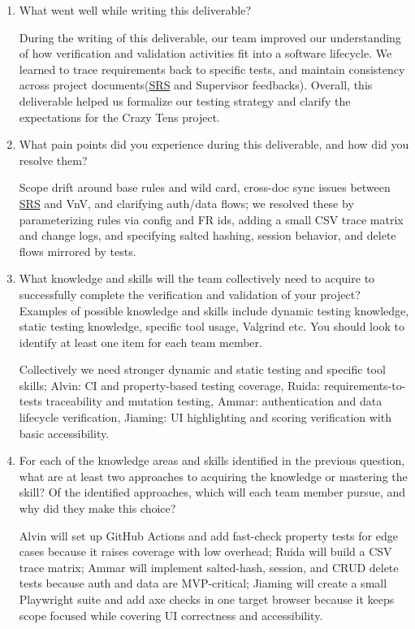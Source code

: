 \documentclass[12pt, titlepage]{article}
\begin{document}


\begin{enumerate}
  \item What went well while writing this deliverable? 

During the writing of this deliverable, our team improved our understanding of how verification and validation activities fit into a software lifecycle.  We learned to trace requirements back to specific tests, and maintain consistency across project documents(\href{../SRS/SRS.pdf}{SRS} and Supervisor feedbacks). Overall, this deliverable helped us formalize our testing strategy and clarify the expectations for the Crazy Tens project.
  \item What pain points did you experience during this deliverable, and how
    did you resolve them?


Scope drift around base rules and wild card, cross-doc sync issues between \href{../SRS/SRS.pdf}{SRS} and VnV, and clarifying auth/data flows; we resolved these by parameterizing rules via config and FR ids, adding a small CSV trace matrix and change logs, and specifying salted hashing, session behavior, and delete flows mirrored by tests.
  \item What knowledge and skills will the team collectively need to acquire to
  successfully complete the verification and validation of your project?
  Examples of possible knowledge and skills include dynamic testing knowledge,
  static testing knowledge, specific tool usage, Valgrind etc.  You should look to
  identify at least one item for each team member.

Collectively we need stronger dynamic and static testing and specific tool skills; Alvin: CI and property-based testing coverage, Ruida: requirements-to-tests traceability and mutation testing, Ammar: authentication and data lifecycle verification, Jiaming: UI highlighting and scoring verification with basic accessibility.
  \item For each of the knowledge areas and skills identified in the previous
  question, what are at least two approaches to acquiring the knowledge or
  mastering the skill?  Of the identified approaches, which will each team
  member pursue, and why did they make this choice?

Alvin will set up GitHub Actions and add fast-check property tests for edge cases because it raises coverage with low overhead; Ruida will build a CSV trace matrix; Ammar will implement salted-hash, session, and CRUD delete tests because auth and data are MVP-critical; Jiaming will create a small Playwright suite and add axe checks in one target browser because it keeps scope focused while covering UI correctness and accessibility.
\end{enumerate}
\end{document}
